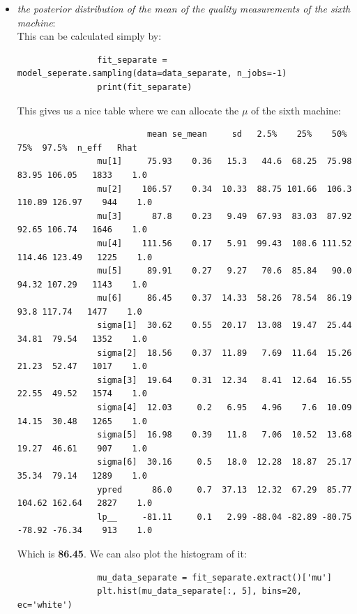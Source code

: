 \documentclass[11pt,a4paper,english]{article}
\begin{document}
          \begin{itemize}
            \item \textit{the posterior distribution of the mean of the quality measurements of the sixth machine}: \\
              This can be calculated simply by:
              \begin{verbatim}
                fit_separate = model_seperate.sampling(data=data_separate, n_jobs=-1)
                print(fit_separate)
              \end{verbatim}
              This gives us a nice table where we can allocate the $\mu$ of the sixth machine:
              \begin{verbatim}
                          mean se_mean     sd   2.5%    25%    50%    75%  97.5%  n_eff   Rhat
                mu[1]     75.93    0.36   15.3   44.6  68.25  75.98  83.95 106.05   1833    1.0
                mu[2]    106.57    0.34  10.33  88.75 101.66  106.3 110.89 126.97    944    1.0
                mu[3]      87.8    0.23   9.49  67.93  83.03  87.92  92.65 106.74   1646    1.0
                mu[4]    111.56    0.17   5.91  99.43  108.6 111.52 114.46 123.49   1225    1.0
                mu[5]     89.91    0.27   9.27   70.6  85.84   90.0  94.32 107.29   1143    1.0
                mu[6]     86.45    0.37  14.33  58.26  78.54  86.19   93.8 117.74   1477    1.0
                sigma[1]  30.62    0.55  20.17  13.08  19.47  25.44  34.81  79.54   1352    1.0
                sigma[2]  18.56    0.37  11.89   7.69  11.64  15.26  21.23  52.47   1017    1.0
                sigma[3]  19.64    0.31  12.34   8.41  12.64  16.55  22.55  49.52   1574    1.0
                sigma[4]  12.03     0.2   6.95   4.96    7.6  10.09  14.15  30.48   1265    1.0
                sigma[5]  16.98    0.39   11.8   7.06  10.52  13.68  19.27  46.61    907    1.0
                sigma[6]  30.16     0.5   18.0  12.28  18.87  25.17  35.34  79.14   1289    1.0
                ypred      86.0     0.7  37.13  12.32  67.29  85.77 104.62 162.64   2827    1.0
                lp__     -81.11     0.1   2.99 -88.04 -82.89 -80.75 -78.92 -76.34    913    1.0
              \end{verbatim}
              Which is \textbf{86.45}. We can also plot the histogram of it:
              \begin{verbatim}
                mu_data_separate = fit_separate.extract()['mu']
                plt.hist(mu_data_separate[:, 5], bins=20, ec='white')

\end{verbatim}
\end{itemize}
\end{document}
